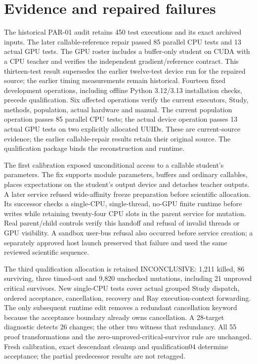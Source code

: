 \section{Evidence and repaired failures}
The historical PAR-01 audit retains 450 test executions and its exact archived
inputs. The later callable-reference repair passed 85 parallel CPU tests
and 13 actual GPU tests. The GPU roster includes a buffer-only student on
CUDA with a CPU teacher and verifies the independent gradient/reference
contract. This thirteen-test result supersedes the earlier twelve-test device
run for the repaired source; the earlier timing measurements remain historical.
Fourteen fixed development operations, including offline Python 3.12/3.13
installation checks, precede qualification. Six affected operations verify the
current executors, Study, methods, population, actual hardware and manual. The
current population operation passes 85 parallel CPU tests; the actual device
operation passes 13 actual GPU tests on two explicitly allocated UUIDs. These
are current-source evidence; the earlier callable-repair results retain their
original source. The qualification package binds the reconstruction and runtime.

The first calibration exposed unconditional access to a callable student's
parameters. The fix supports module parameters, buffers and ordinary callables,
places expectations on the student's output device and detaches teacher
outputs. A later service refused wide-affinity freeze preparation before
scientific allocation. Its successor checks a single-CPU, single-thread,
no-GPU finite runtime before writes while retaining twenty-four CPU slots in
the parent service for mutation. Real parent/child controls verify this handoff
and refusal of invalid threads or GPU visibility. A sandbox user-bus refusal
also occurred before service creation; a separately approved host launch
preserved that failure and used the same reviewed scientific sequence.

The third qualification allocation is retained INCONCLUSIVE: 1,211 killed,
86 surviving, three timed-out and 9,820 unchecked mutations, including 21
unproved critical survivors. New single-CPU tests cover actual grouped Study
dispatch, ordered acceptance, cancellation, recovery and Ray execution-context
forwarding. The only subsequent runtime edit removes a redundant cancellation
keyword because the acceptance boundary already owns cancellation. A 28-target
diagnostic detects 26 changes; the other two witness that redundancy. All 55
proof transformations and the zero-unproved-critical-survivor rule are unchanged.
Fresh calibration, exact descendant cleanup and qualification04 determine
acceptance; the partial predecessor results are not retagged.

